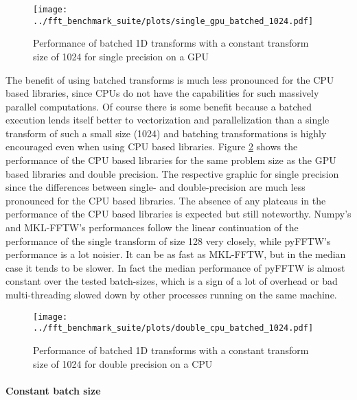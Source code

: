 \documentclass[english,11pt,a4paper,table]{article} %
\begin{document}
\begin{figure}
	\centering
	\texttt{[image: ../fft\_benchmark\_suite/plots/single\_gpu\_batched\_1024.pdf]}
	\caption{Performance of batched 1D transforms with a constant transform size of 1024 for single precision on a GPU}
	\label{batched-single-size-1024}
\end{figure}

The benefit of using batched transforms is much less pronounced for the CPU based libraries, since CPUs do not have the capabilities for such massively parallel computations.
Of course there is some benefit because a batched execution lends itself better to vectorization and parallelization than a single transform of such a small size (1024) and batching transformations is highly encouraged even when using CPU based libraries.
Figure \ref{batched-double-size-1024-gpu} shows the performance of the CPU based libraries for the same problem size as the GPU based libraries and double precision. 
The respective graphic for single precision since the differences between single- and double-precision are much less pronounced for the CPU based libraries.
The absence of any plateaus in the performance of the CPU based libraries is expected but still noteworthy.
Numpy's and MKL-FFTW's performances follow the linear continuation of the performance of the single transform of size 128 very closely, while pyFFTW's performance is a lot noisier.
It can be as fast as MKL-FFTW, but in the median case it tends to be slower.
In fact the median performance of pyFFTW is almost constant over the tested batch-sizes, which is a sign of a lot of overhead or bad multi-threading slowed down by other processes running on the same machine.

\begin{figure}[H]
	\centering
	\texttt{[image: ../fft\_benchmark\_suite/plots/double\_cpu\_batched\_1024.pdf]}
	\caption{Performance of batched 1D transforms with a constant transform size of 1024 for double precision on a CPU}
	\label{batched-double-size-1024-gpu}
\end{figure}

\paragraph{Constant batch size}\mbox{}\\
\end{document}
